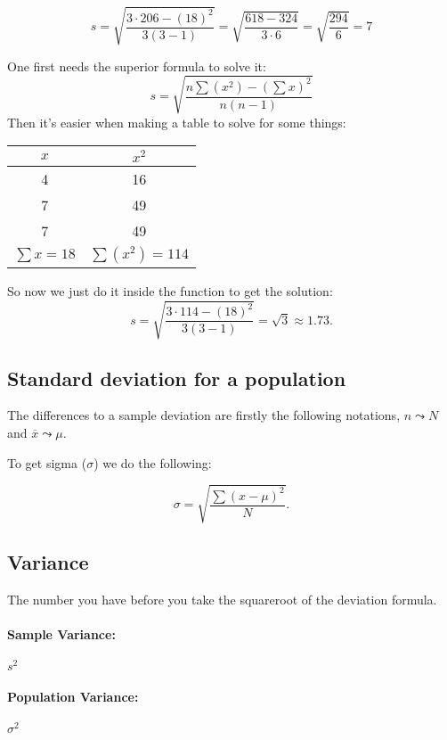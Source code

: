 \[ s = \sqrt{\frac{3\cdot 206 - (18)^2}{3(3-1)}} 
= \sqrt{\frac{618-324}{3\cdot 6}} = \sqrt{\frac{294}{6}} = 7\] 


One first needs the superior formula to solve it:
\[s= \sqrt{\frac{n\sum (x^2) - (\sum x)^2 }{n(n-1)}}\] 
Then it's easier when making a table to solve for some things:


\begin{table}[htbp]
    \centering
    \begin{tabular}{c|c}
        \toprule
        $x$ & $x^2$ \\
        \midrule
        4 & 16 \\
        7 & 49 \\
        7 & 49 \\
        \midrule
        $\sum x=18$ & $\sum(x^2)=114$ \\
        \bottomrule
    \end{tabular}
\end{table}

So now we just do it inside the function to get the solution:
\[
    s= \sqrt{\frac{3\cdot 114 - (18)^2}{3(3-1)}} = \sqrt{3} \approx 1.73
.\] 


\subsection{Standard deviation for a population}

The differences to a sample deviation are firstly the following notations, 
$n \leadsto N$ and $\overline{x} \leadsto \mu$.

To get sigma ($\sigma$) we do the following:

\[ \sigma = \sqrt{\frac{\sum (x-\mu)^2}{N}} .\] 


\subsection{Variance}
The number you have before you take the squareroot of the deviation formula.

\paragraph{Sample Variance:} $s^2$
\paragraph{Population Variance:} $\sigma^2$

